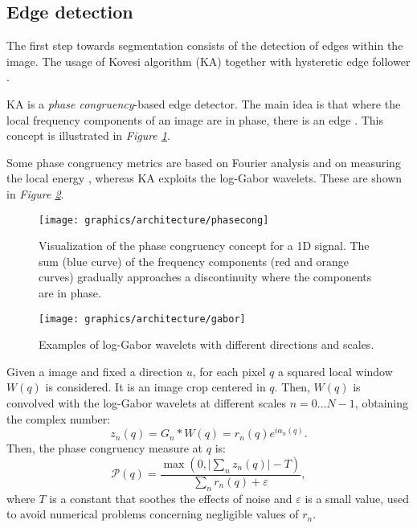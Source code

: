     \subsection{Edge detection}\label{subsection:contour_detection}
        \par{
            The first step towards segmentation consists of the detection of edges within the image. The usage of Kovesi algorithm (KA) \cite{mit:kovesiphase, googlescholar:kovesiphase} together with hysteretic edge follower \cite{Klette:2014:CCV:2584519}.
        }
        \par{
            KA is a \emph{phase congruency}-based edge detector. The main idea is that where the local frequency components of an image are in phase, there is an edge \cite{researchgate:morrone}. This concept is illustrated in \emph{Figure \ref{fig:phase-congruency}}.
        }
        \par{
            Some phase congruency metrics are based on Fourier analysis and on measuring the local energy \cite{researchgate:phase}, whereas KA exploits the log-Gabor wavelets. These are shown in \emph{Figure \ref{fig:gabor}}.
        }
    	\begin{figure}
    		\centering
    		\texttt{[image: graphics/architecture/phasecong]}
    		\caption{Visualization of the phase congruency concept for a 1D signal. The sum (blue curve) of the frequency components (red and orange curves) gradually approaches a discontinuity where the components are in phase.}
    		\label{fig:phase-congruency}
    	\end{figure}
    	\begin{figure}
    		\centering
    		\texttt{[image: graphics/architecture/gabor]}
    		\caption{Examples of log-Gabor wavelets with different directions and scales.}
    		\label{fig:gabor}
    	\end{figure}
		\par{
			Given a image and fixed a direction $u$, for each pixel $q$ a squared local window $W(q)$ is considered. It is an image crop centered in $q$. Then, $W(q)$ is convolved with the log-Gabor wavelets at different scales $n = 0 \dots N-1$, obtaining the complex number:
	    	\begin{equation*}
	    		z_{n} (q) = G_{n} * W(q) = r_{n} (q) e^{i \alpha_{n} (q)}.
	    	\end{equation*}
	    	Then, the phase congruency measure at $q$ is:
            \begin{equation*}
	            \mathcal{P} (q) = \frac{\max(0,\lvert \sum_{n} z_{n} (q) \rvert - T)}{\sum_{n} r_{n} (q) + \varepsilon},
            \end{equation*}
            where $T$ is a constant that soothes the effects of noise and $\varepsilon$ is a small value, used to avoid numerical problems concerning negligible values of $r_n$. 
        }
